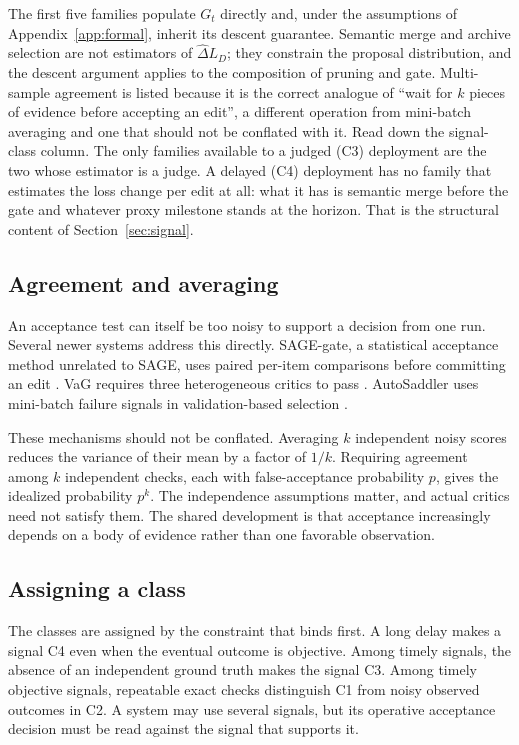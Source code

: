 The first five families populate \(G_t\) directly and, under the assumptions of Appendix~\ref{app:formal}, inherit its descent guarantee. Semantic merge and archive selection are not estimators of \(\widehat{\Delta} L_D\); they constrain the proposal distribution, and the descent argument applies to the composition of pruning and gate. Multi-sample agreement is listed because it is the correct analogue of ``wait for \(k\) pieces of evidence before accepting an edit'', a different operation from mini-batch averaging and one that should not be conflated with it. Read down the signal-class column. The only families available to a judged (C3) deployment are the two whose estimator is a judge. A delayed (C4) deployment has no family that estimates the loss change per edit at all: what it has is semantic merge before the gate and whatever proxy milestone stands at the horizon. That is the structural content of Section~\ref{sec:signal}.

\subsection{Agreement and averaging}\label{agreement-and-averaging}

An acceptance test can itself be too noisy to support a decision from one run. Several newer systems address this directly. SAGE-gate, a statistical acceptance method unrelated to SAGE, uses paired per-item comparisons before committing an edit \citep{wang2026sagegate}. VaG requires three heterogeneous critics to pass \citep{shang2026vag}. AutoSaddler uses mini-batch failure signals in validation-based selection \citep{park2026autosaddler}.

These mechanisms should not be conflated. Averaging \(k\) independent noisy scores reduces the variance of their mean by a factor of \(1/k\). Requiring agreement among \(k\) independent checks, each with false-acceptance probability \(p\), gives the idealized probability \(p^k\). The independence assumptions matter, and actual critics need not satisfy them. The shared development is that acceptance increasingly depends on a body of evidence rather than one favorable observation.

\subsection{Assigning a class}\label{assigning-a-class}

The classes are assigned by the constraint that binds first. A long delay makes a signal C4 even when the eventual outcome is objective. Among timely signals, the absence of an independent ground truth makes the signal C3. Among timely objective signals, repeatable exact checks distinguish C1 from noisy observed outcomes in C2. A system may use several signals, but its operative acceptance decision must be read against the signal that supports it.

